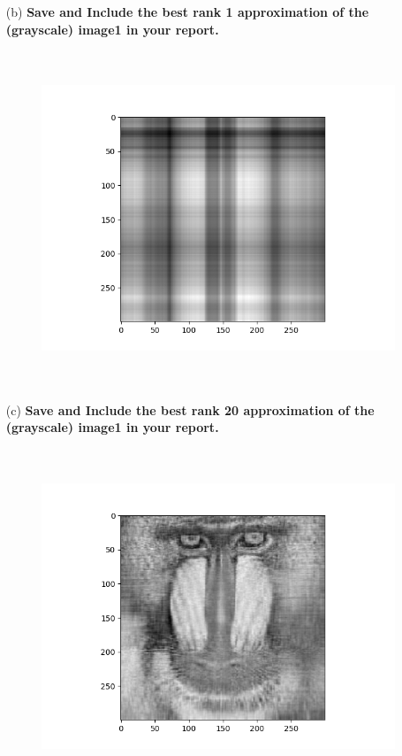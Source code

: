 \documentclass[11pt,oneside,notitlepage]{article}
\begin{document}
\begin{itemize}

	\item[(b)] 
	\textbf{Save and Include the best rank 1 approximation of the (grayscale) image1 in your report.}
    \begin{figure}[H]
    \vspace{-0.5cm}
    \begin{center}
        \includegraphics[height=10cm]{ps0_template/p3b.png}
    \end{center}
    \end{figure}

	\item[(c)]
	\textbf{Save and Include the best rank 20 approximation of the (grayscale) image1 in your report.}
    \begin{figure}[H]
    \vspace{-0.5cm}
    \begin{center}
        \includegraphics[height=10cm]{ps0_template/p3c.png}
    \end{center}
    \end{figure}
\end{itemize}
\end{document}
